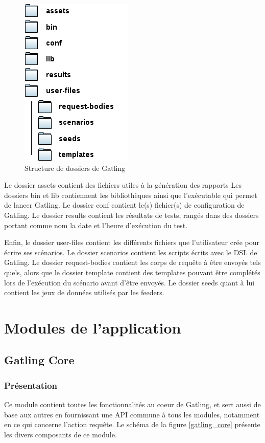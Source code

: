 \begin{figure}[h]
\begin{center}
\includegraphics{img/folders.png}
\end{center}
\caption{Structure de dossiers de Gatling}
\label{folders}
\end{figure}

Le dossier assets contient des fichiers utiles à la génération des rapports Les dossiers bin et lib contiennent les bibliothèques ainsi que l'exécutable qui permet de lancer Gatling. Le dossier conf contient le(s) fichier(s) de configuration de Gatling. Le dossier results contient les résultats de tests, rangés dans des dossiers portant comme nom la date et l'heure d'exécution du test.

Enfin, le dossier user-files contient les différents fichiers que l'utilisateur crée pour écrire ses scénarios. Le dossier scenarios contient les scripts écrits avec le DSL de Gatling. Le dossier request-bodies contient les corps de requête à être envoyés tels quels, alors que le dossier template contient des templates pouvant être complétés lors de l'exécution du scénario avant d'être envoyés. Le dossier seeds quant à lui contient les jeux de données utilisés par les feeders.

\section{Modules de l'application}
\subsection{Gatling Core}
\subsubsection{Présentation}
Ce module contient toutes les fonctionnalités au coeur de Gatling, et sert aussi de base aux autres en fournissant une API commune à tous les modules, notamment en ce qui concerne l'action requête. Le schéma de la figure \ref{gatling_core} présente les divers composants de ce module.

